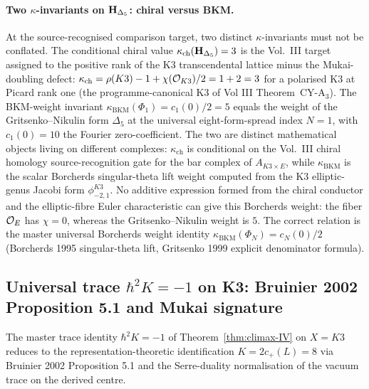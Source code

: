 \paragraph{Two $\kappa$-invariants on $\mathbf{H}_{\Delta_5}$: chiral versus BKM.}
At the source-recognised comparison target, two distinct
$\kappa$-invariants must not be conflated. The conditional chiral
value $\kappa_{\mathrm{ch}}(\mathbf{H}_{\Delta_5}) = 3$ is the Vol.~III
target assigned to the positive rank of the K3 transcendental lattice
minus the Mukai-doubling defect:
$\kappa_{\mathrm{ch}} = \rho(K3) - 1 + \chi(\mathcal{O}_{K3})/2 = 1 + 2 = 3$
for a polarised K3 at Picard rank one (the programme-canonical K3 of
Vol III Theorem~CY-A$_3$). The BKM-weight invariant
$\kappa_{\mathrm{BKM}}(\Phi_1) = c_1(0)/2 = 5$ equals the weight of
the Gritsenko--Nikulin form $\Delta_5$ at the universal
eight-form-spread index $N = 1$, with $c_1(0) = 10$ the Fourier
zero-coefficient. The two are distinct mathematical objects living
on different complexes: $\kappa_{\mathrm{ch}}$ is conditional on the
Vol.~III chiral homology source-recognition gate for the bar complex
of $A_{K3\times E}$, while $\kappa_{\mathrm{BKM}}$ is the scalar
Borcherds singular-theta lift weight computed from the K3
elliptic-genus Jacobi form
$\phi^{K3}_{-2,1}$. No additive expression formed from the chiral
conductor and the elliptic-fibre Euler characteristic can give this
Borcherds weight: the fiber $\mathcal{O}_E$ has $\chi = 0$, whereas the
Gritsenko--Nikulin weight is $5$.
The correct relation is the master universal Borcherds weight
identity $\kappa_{\mathrm{BKM}}(\Phi_N) = c_N(0)/2$ (Borcherds 1995
singular-theta lift, Gritsenko 1999 explicit denominator formula).

\subsection{Universal trace $\hbar^2 K = -1$ on K3: Bruinier 2002 Proposition 5.1 and Mukai signature}
\label{subsec:voa-hbar-K-universal-trace}

The master trace identity $\hbar^2 K = -1$ of
Theorem~\ref{thm:climax-IV} on $X = K3$ reduces to the
representation-theoretic identification $K = 2c_+(L) = 8$ via
Bruinier 2002 Proposition 5.1 and the Serre-duality normalisation
of the vacuum trace on the derived centre.

